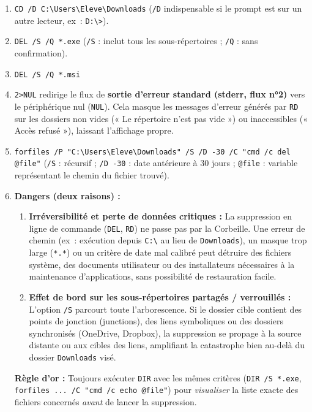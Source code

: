 \documentclass[11pt]{article}
\begin{document}
\begin{corrige}
\begin{enumerate}
    \item \texttt{CD /D C:\textbackslash Users\textbackslash Eleve\textbackslash Downloads} \quad (\texttt{/D} indispensable si le prompt est sur un autre lecteur, ex~: \texttt{D:\textbackslash>}).
    \item \texttt{DEL /S /Q *.exe} \quad (\texttt{/S} : inclut tous les sous-répertoires ; \texttt{/Q} : sans confirmation).
    \item \texttt{DEL /S /Q *.msi}
    \item \texttt{2\textgreater{}NUL} redirige le flux de \textbf{sortie d'erreur standard (stderr, flux n°2)} vers le périphérique nul (\texttt{NUL}). Cela masque les messages d'erreur générés par \texttt{RD} sur les dossiers non vides (« Le répertoire n'est pas vide ») ou inaccessibles (« Accès refusé »), laissant l'affichage propre.
    \item \texttt{forfiles /P "C:\textbackslash Users\textbackslash Eleve\textbackslash Downloads" /S /D -30 /C "cmd /c del @file"} \quad (\texttt{/S} : récursif ; \texttt{/D -30} : date antérieure à 30 jours ; \texttt{@file} : variable représentant le chemin du fichier trouvé).
    \item \textbf{Dangers (deux raisons) :}
    \begin{enumerate}
        \item \textbf{Irréversibilité et perte de données critiques :} La suppression en ligne de commande (\texttt{DEL}, \texttt{RD}) ne passe pas par la Corbeille. Une erreur de chemin (ex~: exécution depuis \texttt{C:\textbackslash} au lieu de \texttt{Downloads}), un masque trop large (\texttt{*.*}) ou un critère de date mal calibré peut détruire des fichiers système, des documents utilisateur ou des installateurs nécessaires à la maintenance d'applications, sans possibilité de restauration facile.
        \item \textbf{Effet de bord sur les sous-répertoires partagés / verrouillés :} L'option \texttt{/S} parcourt toute l'arborescence. Si le dossier cible contient des points de jonction (junctions), des liens symboliques ou des dossiers synchronisés (OneDrive, Dropbox), la suppression se propage à la source distante ou aux cibles des liens, amplifiant la catastrophe bien au-delà du dossier \texttt{Downloads} visé.
    \end{enumerate}
    \textbf{Règle d'or :} Toujours exécuter \texttt{DIR} avec les mêmes critères (\texttt{DIR /S *.exe}, \texttt{forfiles ... /C "cmd /c echo @file"}) pour \emph{visualiser} la liste exacte des fichiers concernés \emph{avant} de lancer la suppression.
\end{enumerate}
\end{corrige}
\end{document}
